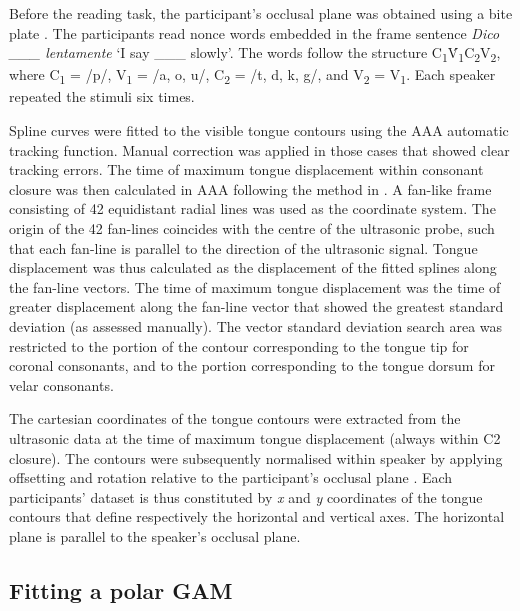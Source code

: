 \documentclass[12pt,]{article}
\begin{document}
Before the reading task, the participant's occlusal plane was obtained
using a bite plate \citep{scobbie2011}. The participants read nonce
words embedded in the frame sentence \emph{Dico \_\_\_ lentamente} `I
say \_\_\_ slowly'. The words follow the structure
C\textsubscript{1}V́\textsubscript{1}C\textsubscript{2}V\textsubscript{2},
where C\textsubscript{1} = /p/, V\textsubscript{1} = /a, o, u/,
C\textsubscript{2} = /t, d, k, g/, and V\textsubscript{2} =
V\textsubscript{1}. Each speaker repeated the stimuli six times.

Spline curves were fitted to the visible tongue contours using the AAA
automatic tracking function. Manual correction was applied in those
cases that showed clear tracking errors. The time of maximum tongue
displacement within consonant closure was then calculated in AAA
following the method in \citet{strycharczuk2015}. A fan-like frame
consisting of 42 equidistant radial lines was used as the coordinate
system. The origin of the 42 fan-lines coincides with the centre of the
ultrasonic probe, such that each fan-line is parallel to the direction
of the ultrasonic signal. Tongue displacement was thus calculated as the
displacement of the fitted splines along the fan-line vectors. The time
of maximum tongue displacement was the time of greater displacement
along the fan-line vector that showed the greatest standard deviation
(as assessed manually). The vector standard deviation search area was
restricted to the portion of the contour corresponding to the tongue tip
for coronal consonants, and to the portion corresponding to the tongue
dorsum for velar consonants.

The cartesian coordinates of the tongue contours were extracted from the
ultrasonic data at the time of maximum tongue displacement (always
within C2 closure). The contours were subsequently normalised within
speaker by applying offsetting and rotation relative to the
participant's occlusal plane \citep{scobbie2011}. Each participants'
dataset is thus constituted by \emph{x} and \emph{y} coordinates of the
tongue contours that define respectively the horizontal and vertical
axes. The horizontal plane is parallel to the speaker's occlusal plane.

\hypertarget{fitting-a-polar-gam}{%
\subsection{Fitting a polar GAM}\label{fitting-a-polar-gam}}
\end{document}
